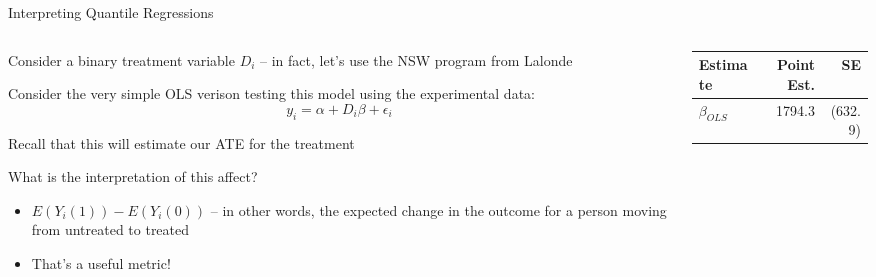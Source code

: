 \documentclass[notes,11pt, aspectratio=169]{beamer}
\newenvironment{wideitemize}{\itemize\addtolength{\itemsep}{10pt}}{\enditemize}
\begin{document}
\begin{frame}{Interpreting Quantile Regressions}
  \begin{columns}[T] %
\begin{column}{.6\textwidth}
  \begin{wideitemize}
  \item Consider a binary treatment variable $D_{i}$ -- in fact, let's use the
    NSW program from Lalonde
  \item Consider the very simple OLS verison testing this model using
    the experimental data:
    $$y_{i} = \alpha + D_{i}\beta + \epsilon_{i}$$
  \item Recall that this will estimate our ATE for the treatment
  \item What is the interpretation of this affect?
    \begin{itemize}
    \item $E(Y_{i}(1)) - E(Y_{i}(0))$ -- in other words, the expected
      change in the outcome for a person moving from untreated to
      treated
    \item That's a useful metric!
    \end{itemize}
  \end{wideitemize}
  \end{column}%
  \hfill%
  \begin{column}{.4\textwidth}
    \begin{tabular}{lrr}
      Estimate & Point Est. & SE \\
      \midrule
      $\beta_{OLS}$ &  1794.3  & (632.9)\\
      \end{tabular}
  \end{column}
\end{columns}
\end{frame}
\end{document}
